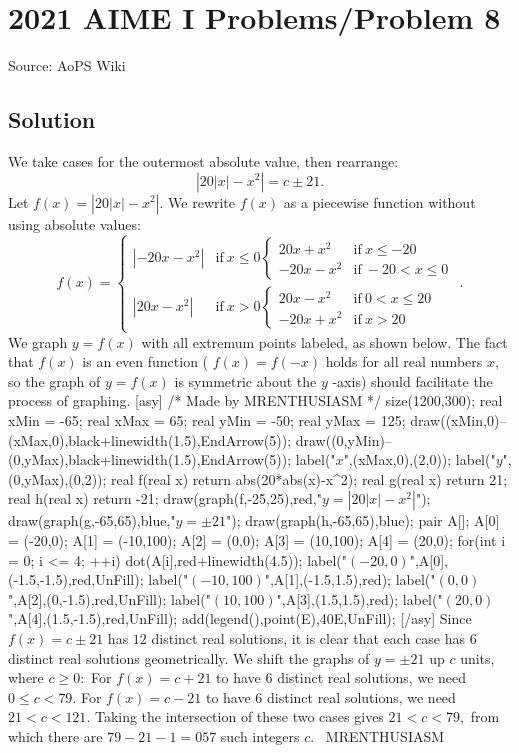 \documentclass[12pt]{article}
\begin{document}
\section*{{2021 AIME I Problems/Problem 8}}
Source: AoPS Wiki

\subsection*{Solution}
We take cases for the outermost absolute value, then rearrange: \[\left|20|x|-x^2\right|=c\pm21.\] Let $f(x)=\left|20|x|-x^2\right|.$ We rewrite $f(x)$ as a piecewise function without using absolute values: \[f(x) = \begin{cases} \left|-20x-x^2\right| & \mathrm{if} \ x \le 0 \begin{cases} 20x+x^2 & \mathrm{if} \ x\le-20 \\ -20x-x^2 & \mathrm{if} \ -20<x\leq0 \end{cases} \\ \left|20x-x^2\right| & \mathrm{if} \ x > 0 \begin{cases} 20x-x^2 & \mathrm{if} \ 0<x\leq20 \\ -20x+x^2 & \mathrm{if} \ x>20 \end{cases} \end{cases}.\] We graph $y=f(x)$ with all extremum points labeled, as shown below. The fact that $f(x)$ is an even function ( $f(x)=f(-x)$ holds for all real numbers $x,$ so the graph of $y=f(x)$ is symmetric about the $y$ -axis) should facilitate the process of graphing. [asy] /* Made by MRENTHUSIASM */ size(1200,300); real xMin = -65; real xMax = 65; real yMin = -50; real yMax = 125; draw((xMin,0)--(xMax,0),black+linewidth(1.5),EndArrow(5)); draw((0,yMin)--(0,yMax),black+linewidth(1.5),EndArrow(5)); label("$x$",(xMax,0),(2,0)); label("$y$",(0,yMax),(0,2)); real f(real x) { return abs(20*abs(x)-x^2); } real g(real x) { return 21; } real h(real x) { return -21; } draw(graph(f,-25,25),red,"$y=\left|20|x|-x^2\right|$"); draw(graph(g,-65,65),blue,"$y=\pm21$"); draw(graph(h,-65,65),blue); pair A[]; A[0] = (-20,0); A[1] = (-10,100); A[2] = (0,0); A[3] = (10,100); A[4] = (20,0); for(int i = 0; i <= 4; ++i) { dot(A[i],red+linewidth(4.5)); } label("$(-20,0)$",A[0],(-1.5,-1.5),red,UnFill); label("$(-10,100)$",A[1],(-1.5,1.5),red); label("$(0,0)$",A[2],(0,-1.5),red,UnFill); label("$(10,100)$",A[3],(1.5,1.5),red); label("$(20,0)$",A[4],(1.5,-1.5),red,UnFill); add(legend(),point(E),40E,UnFill); [/asy] Since $f(x)=c\pm21$ has $12$ distinct real solutions, it is clear that each case has $6$ distinct real solutions geometrically. We shift the graphs of $y=\pm21$ up $c$ units, where $c\geq0:$ For $f(x)=c+21$ to have $6$ distinct real solutions, we need $0\leq c<79.$ For $f(x)=c-21$ to have $6$ distinct real solutions, we need $21<c<121.$ Taking the intersection of these two cases gives $21<c<79,$ from which there are $79-21-1=\boxed{057}$ such integers $c.$ ~MRENTHUSIASM
\end{document}
